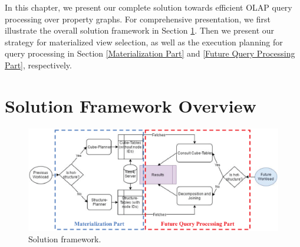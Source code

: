 
In this chapter, we present our complete solution towards efficient OLAP query processing over property graphs. For comprehensive presentation, we first illustrate the overall solution framework in Section \ref{s:4.1}. Then we present our strategy for materialized view selection, as well as the execution planning for query processing in Section \ref{Materialization Part} and \ref{Future Query Processing Part}, respectively.



\section{Solution Framework Overview}
\label{s:4.1}

\begin{figure}
	\centering
	\includegraphics[scale=0.8]{pic/41.eps}
	\caption{Solution framework.}
	\label{Solution framework}
\end{figure}

